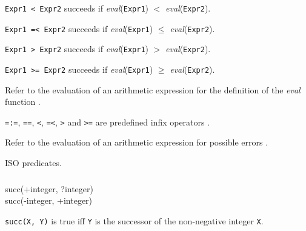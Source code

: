 \texttt{Expr1 < Expr2} succeeds if \textit{eval}(\texttt{Expr1}) $<$
\textit{eval}(\texttt{Expr2}).

\texttt{Expr1 =< Expr2} succeeds if \textit{eval}(\texttt{Expr1})
$\leq$ \textit{eval}(\texttt{Expr2}).

\texttt{Expr1 > Expr2} succeeds if \textit{eval}(\texttt{Expr1}) $>$
\textit{eval}(\texttt{Expr2}).

\texttt{Expr1 >= Expr2} succeeds if \textit{eval}(\texttt{Expr1})
$\geq$ \textit{eval}(\texttt{Expr2}).

Refer to the evaluation of an arithmetic expression for the definition of
the \textit{eval} function .

\texttt{=:=}, \texttt{={\bs}=}, \texttt{<}, \texttt{=<},
\texttt{>} and \texttt{>=} are predefined infix operators
.

\Errors

Refer to the evaluation of an arithmetic expression for possible errors
.

\Portability

ISO predicates.



\subsubsection{}

\begin{TemplatesOneCol}
succ(+integer, ?integer) \\
succ(-integer, +integer) 

\end{TemplatesOneCol}

\Description

\texttt{succ(X, Y)} is true iff \texttt{Y} is the successor of the non-negative integer \texttt{X}. 

\begin{PlErrors}







\end{PlErrors}

